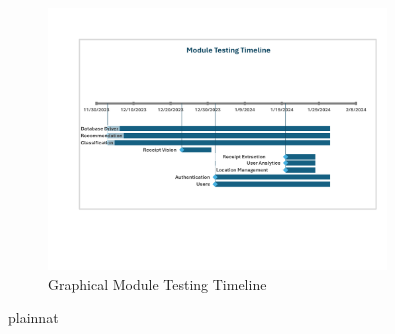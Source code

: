 \documentclass[12pt, titlepage]{article}
\begin{document}
\begin{figure}[H]
  \centering
  \caption{Graphical Module Testing Timeline}\label{FigureModuleTestingTimeline}
  \includegraphics[width=0.8\textwidth]{./res/ModuleTestTimeline.pdf}
\end{figure}


 {plainnat}


\newpage{}
\end{document}
